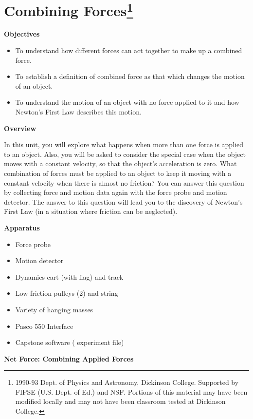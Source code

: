 
\section{Combining Forces\footnote{
1990-93 Dept. of Physics and Astronomy, Dickinson College. Supported by FIPSE
(U.S. Dept. of Ed.) and NSF. Portions of this material may have been modified
locally and may not have been classroom tested at Dickinson College.
}}

\makelabheader %

\textbf{Objectives}

\begin{itemize}
\item To understand how different forces can act together to make up a combined force.~ 
\item To establish a definition of combined force as that which changes the motion
of an object.
\item To understand the motion of an object with no force applied to it and how Newton's
First Law describes this motion.
\end{itemize}
\textbf{Overview}

In this unit, you will explore what happens when more than one force is applied
to an object. Also, you will be asked to consider the special case when the
object moves with a constant velocity, so that the object's acceleration is
zero. What combination of forces must be applied to an object to keep it moving
with a constant velocity when there is almost no friction? You can answer this
question by collecting force and motion data again with the force probe and
motion detector. The answer to this question will lead you to the discovery
of Newton's First Law (in a situation where friction can be neglected).

\textbf{Apparatus}

\begin{itemize}
\item Force probe
\item Motion detector
\item Dynamics cart (with flag) and track
\item Low friction pulleys (2) and string
\item Variety of hanging masses
\item Pasco 550 Interface
\item Capstone software ( experiment file)
\end{itemize}
\textbf{Net Force: Combining Applied Forces }

